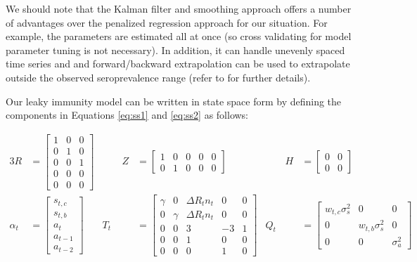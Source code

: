 \documentclass{article}
\begin{document}
We should note that the Kalman filter and smoothing approach offers a number of advantages over the penalized regression approach for our situation. For example, the parameters are estimated all at once (so cross validating for model parameter tuning is not necessary). In addition, it can handle unevenly spaced time series and and forward/backward extrapolation can be used to extrapolate outside the observed seroprevalence range (refer to \citet{durbin2012time} for further details).

Our leaky immunity model can be written in state space form by defining the components in Equations \ref{eq:ss1} and \ref{eq:ss2} as follows:

\begin{alignat*}{3}
R &= \begin{bmatrix}
1 & 0 & 0 \\ 
0 & 1 & 0\\ 
0 & 0 & 1\\ 
0 & 0 & 0\\ 
0 & 0 & 0 
\end{bmatrix} &\qquad 
Z &= \begin{bmatrix}
1 & 0 & 0 & 0 & 0 \\ 
0 & 1 & 0 & 0 & 0
\end{bmatrix} &\qquad 
H &= \begin{bmatrix}
0 & 0 \\ 
0 & 0
\end{bmatrix} \\
\alpha_t &= \begin{bmatrix}
s_{t,c}\\
s_{t,b}\\ 
a_t\\ 
a_{t-1}\\ 
a_{t-2}
\end{bmatrix} & 
T_t &= \begin{bmatrix}
 \gamma & 0 & \Delta R_tn_t & 0 & 0\\ 
 0 & \gamma & \Delta R_tn_t & 0 & 0 \\ 
 0 & 0 & 3 & -3 & 1 \\ 
 0 & 0 & 1 & 0 & 0\\ 
 0 & 0 & 0 & 1 & 0
\end{bmatrix}  & 
Q_t &= \begin{bmatrix}
w_{t,c}\sigma^2_s & 0 & 0 \\ 
0 & w_{t,b}\sigma^2_s  & 0 \\ 
0 & 0 & \sigma^2_a
\end{bmatrix} \\

\end{alignat*}
\end{document}
